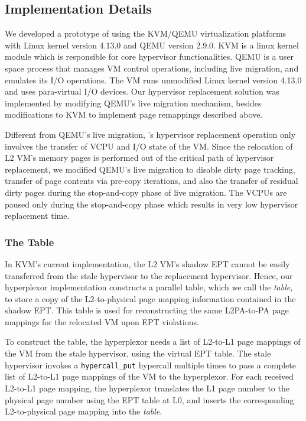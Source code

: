 \subsection{Implementation Details} 
We developed a prototype of \arch using the KVM/QEMU virtualization platforms with Linux kernel 
version 4.13.0 and QEMU version 2.9.0. KVM is a linux kernel module which is responsible for 
core hypervisor functionalities. QEMU is a user space process that manages VM control operations,
including live migration, and emulates its I/O operations. The VM runs unmodified Linux kernel 
version 4.13.0 and uses para-virtual I/O devices.
Our hypervisor replacement solution was implemented by modifying QEMU's live migration mechanism, besides
modifications to KVM to implement page remappings described above. 

Different from QEMU's live migration, 
\arch's hypervisor replacement operation only involves the transfer of VCPU and I/O state of the VM. 
Since the relocation of L2 VM's memory pages is performed 
out of the critical path of hypervisor replacement, we modified QEMU's live migration
to disable dirty page tracking, transfer of page contents via pre-copy iterations, and
also the transfer of residual dirty pages during the stop-and-copy phase of live migration. 
The VCPUs are paused only during the stop-and-copy phase which results in very low hypervisor 
replacement time.

\subsubsection{The \arch Table}
In KVM's current implementation, the L2 VM's shadow EPT cannot be easily transferred 
from the stale hypervisor to the replacement hypervisor.
Hence, our hyperplexor implementation constructs a parallel table, which we call the {\em \arch table},
to store a copy of the L2-to-physical page mapping information contained in the shadow EPT.
This \arch table is used for reconstructing the same L2PA-to-PA page mappings for 
the relocated VM upon EPT violations.

To construct the \arch table, the hyperplexor needs a list of L2-to-L1 page mappings 
of the VM from the stale hypervisor, using the virtual EPT table. 
The stale hypervisor invokes a \texttt{hypercall\_put} hypercall multiple times
to pass a complete list of L2-to-L1 page mappings 
of the VM to the hyperplexor. For each received L2-to-L1 page mapping, the hyperplexor translates 
the L1 page number to the physical  page number using the EPT table at L0, and inserts 
the corresponding L2-to-physical page mapping into the {\em \arch table}. 

